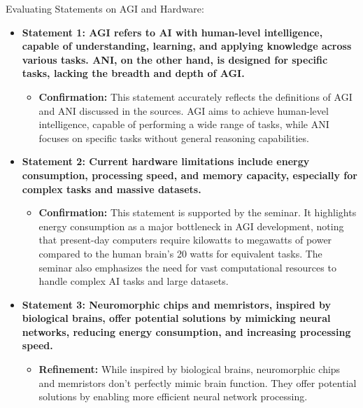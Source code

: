 \documentclass[
]{article}
\author{}
\date{}
\begin{document}
{Evaluating Statements on AGI and
Hardware:}\label{evaluating-statements-on-agi-and-hardware}

\begin{itemize}
\item
  \textbf{Statement 1: AGI refers to AI with human-level intelligence,
  capable of understanding, learning, and applying knowledge across
  various tasks. ANI, on the other hand, is designed for specific tasks,
  lacking the breadth and depth of AGI.}

  \begin{itemize}
  
  \item
    \textbf{Confirmation:} This statement accurately reflects the
    definitions of AGI and ANI discussed in the sources. AGI aims to
    achieve human-level intelligence, capable of performing a wide range
    of tasks, while ANI focuses on specific tasks without general
    reasoning capabilities.
  \end{itemize}
\item
  \textbf{Statement 2: Current hardware limitations include energy
  consumption, processing speed, and memory capacity, especially for
  complex tasks and massive datasets.}

  \begin{itemize}
  
  \item
    \textbf{Confirmation:} This statement is supported by the seminar.
    It highlights energy consumption as a major bottleneck in AGI
    development, noting that present-day computers require kilowatts to
    megawatts of power compared to the human brain's 20 watts for
    equivalent tasks. The seminar also emphasizes the need for vast
    computational resources to handle complex AI tasks and large
    datasets.
  \end{itemize}
\item
  \textbf{Statement 3: Neuromorphic chips and memristors, inspired by
  biological brains, offer potential solutions by mimicking neural
  networks, reducing energy consumption, and increasing processing
  speed.}

  \begin{itemize}
  
  \item
    \textbf{Refinement:} While inspired by biological brains,
    neuromorphic chips and memristors don't perfectly mimic brain
    function. They offer potential solutions by enabling more efficient
    neural network processing.


\end{itemize}
\end{itemize}
\end{document}
